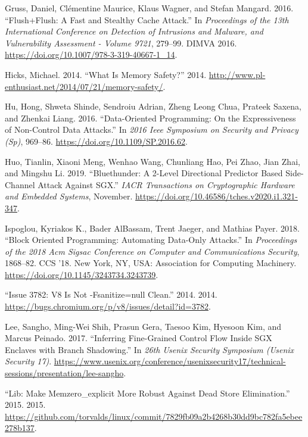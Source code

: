 \documentclass[a4paper,]{report}
\begin{document}
\leavevmode\hypertarget{ref-Gruss2016a}{}%
Gruss, Daniel, Clémentine Maurice, Klaus Wagner, and Stefan Mangard.
2016. ``Flush+Flush: A Fast and Stealthy Cache Attack.'' In
\emph{Proceedings of the 13th International Conference on Detection of
Intrusions and Malware, and Vulnerability Assessment - Volume 9721},
279--99. DIMVA 2016. \url{https://doi.org/10.1007/978-3-319-40667-1_14}.

\leavevmode\hypertarget{ref-Hicks2014}{}%
Hicks, Michael. 2014. ``What Is Memory Safety?'' 2014.
\url{http://www.pl-enthusiast.net/2014/07/21/memory-safety/}.

\leavevmode\hypertarget{ref-Hu2016}{}%
Hu, Hong, Shweta Shinde, Sendroiu Adrian, Zheng Leong Chua, Prateek
Saxena, and Zhenkai Liang. 2016. ``Data-Oriented Programming: On the
Expressiveness of Non-Control Data Attacks.'' In \emph{2016 Ieee
Symposium on Security and Privacy (Sp)}, 969--86.
\url{https://doi.org/10.1109/SP.2016.62}.

\leavevmode\hypertarget{ref-Huo2019}{}%
Huo, Tianlin, Xiaoni Meng, Wenhao Wang, Chunliang Hao, Pei Zhao, Jian
Zhai, and Mingshu Li. 2019. ``Bluethunder: A 2-Level Directional
Predictor Based Side-Channel Attack Against SGX.'' \emph{IACR
Transactions on Cryptographic Hardware and Embedded Systems}, November.
\url{https://doi.org/10.46586/tches.v2020.i1.321-347}.

\leavevmode\hypertarget{ref-Ispoglou2018}{}%
Ispoglou, Kyriakos K., Bader AlBassam, Trent Jaeger, and Mathias Payer.
2018. ``Block Oriented Programming: Automating Data-Only Attacks.'' In
\emph{Proceedings of the 2018 Acm Sigsac Conference on Computer and
Communications Security}, 1868--82. CCS '18. New York, NY, USA:
Association for Computing Machinery.
\url{https://doi.org/10.1145/3243734.3243739}.

\leavevmode\hypertarget{ref-ChromiumIssue}{}%
``Issue 3782: V8 Is Not -Fsanitize=null Clean.'' 2014. 2014.
\url{https://bugs.chromium.org/p/v8/issues/detail?id=3782}.

\leavevmode\hypertarget{ref-Lee2017}{}%
Lee, Sangho, Ming-Wei Shih, Prasun Gera, Taesoo Kim, Hyesoon Kim, and
Marcus Peinado. 2017. ``Inferring Fine-Grained Control Flow Inside SGX
Enclaves with Branch Shadowing.'' In \emph{26th Usenix Security
Symposium (Usenix Security 17)}.
\url{https://www.usenix.org/conference/usenixsecurity17/technical-sessions/presentation/lee-sangho}.

\leavevmode\hypertarget{ref-MemZeroDataBarrier}{}%
``Lib: Make Memzero\_explicit More Robust Against Dead Store
Elimination.'' 2015. 2015.
\url{https://github.com/torvalds/linux/commit/7829fb09a2b4268b30dd9bc782fa5ebee278b137}.
\end{document}
